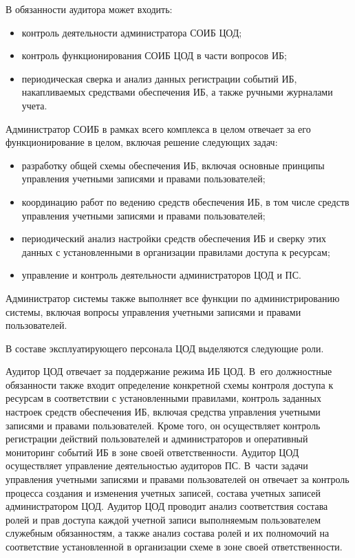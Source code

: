\begin{multicols}{2}
       В обязанности аудитора может входить:
       \begin{itemize}
\item контроль деятельности администратора СОИБ ЦОД;
\item контроль функционирования СОИБ ЦОД в час\-ти вопросов ИБ;
\item периодическая сверка и анализ данных регистрации событий ИБ, накапливаемых 
средствами обеспечения ИБ, а также ручными журналами учета.
\end{itemize}

       Администратор СОИБ в рамках всего комплекса в целом отвечает за его 
функционирование в целом, включая решение следующих задач:
       \begin{itemize}
\item разработку общей схемы обеспечения ИБ, включая основные принципы 
управления учетными записями и правами пользователей;
\item координацию работ по ведению средств обеспечения ИБ, в том числе средств 
управления учетными записями и правами пользователей;
\item периодический анализ настройки средств обеспечения ИБ и сверку этих данных 
с уста\-нов\-лен\-ны\-ми в организации правилами доступа к ресурсам;
\item управление и контроль деятельности администраторов ЦОД и ПС.
\end{itemize}

       Администратор системы также выполняет все функции по администрированию 
сис\-те\-мы, включая вопросы управления учетными записями и правами пользователей.
       
       В составе эксплуатирующего персонала ЦОД выделяются следующие роли.
       
       Аудитор ЦОД отвечает за поддержание режима ИБ ЦОД. В~его должностные 
обязанности \mbox{также} входит определение конкретной схемы конт\-ро\-ля доступа к ресурсам в 
соответствии с уста\-нов\-лен\-ны\-ми правилами, контроль заданных настроек\linebreak
 средств 
обеспечения ИБ, включая средства управ\-ле\-ния учетными записями и правами 
пользо\-вателей. Кроме того, он осуществляет контроль регистра\-ции действий 
пользователей и администраторов и оперативный мониторинг событий ИБ в зоне своей 
ответственности. Аудитор ЦОД осуществляет управление деятельностью аудиторов ПС. В~части задачи 
управ\-ле\-ния учетными записями и правами пользователей он отвечает за контроль процесса 
создания и изменения учетных записей, состава учетных записей администратором ЦОД. 
Аудитор ЦОД проводит анализ соответствия состава ролей и прав доступа каждой учетной записи 
выполняемым пользователем служебным обязанностям, а также анализ состава ролей и их 
полномочий на соответствие уста\-нов\-лен\-ной в организации схеме в зоне своей 
ответственности. 
       

\end{multicols}
